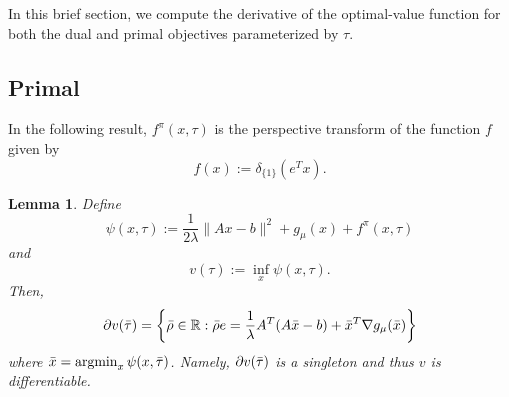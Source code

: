 \documentclass[10pt,a4paper]{article}
\numberwithin{equation}{section}
\newtheorem{lemma}[theorem]{Lemma}
\theoremstyle{definition}
\def\rr{{\mathbb R}}
\DeclareMathOperator{\argmin}{argmin}
\begin{document}
In this brief section, we compute the derivative of the optimal-value function for both the dual and primal objectives parameterized by $\tau$. 

\subsection{Primal}


In the following result, $f^{\pi}(x, \tau)$ is the perspective transform of the function $f$ given by 
\[
f(x) := \delta_{\{1\}}(e^Tx).
\]

\begin{lemma}
    Define
    \[
    \psi(x, \tau) := \frac{1}{2 \lambda}\lVert Ax - b \rVert^2 + g_\mu(x) + f^{\pi}(x, \tau)
    \]
    and
    \[
    v(\tau) := \inf_x \psi(x, \tau).
    \]
    Then,
    \[
    \partial v(\Bar{\tau}) = \left\{ \Bar{\rho} \in \rr: \Bar{\rho} e = \frac{1}{\lambda}A^T(A\Bar{x}-b) + \Bar{x}^T \nabla g_{\mu}(\Bar{x}) \right\}
    \]
    where $\Bar{x} = \argmin_x \psi(x, \bar{\tau})$. Namely,  $\partial v(\Bar{\tau})$ is a singleton and thus $v$ is differentiable.
\end{lemma}
\end{document}

